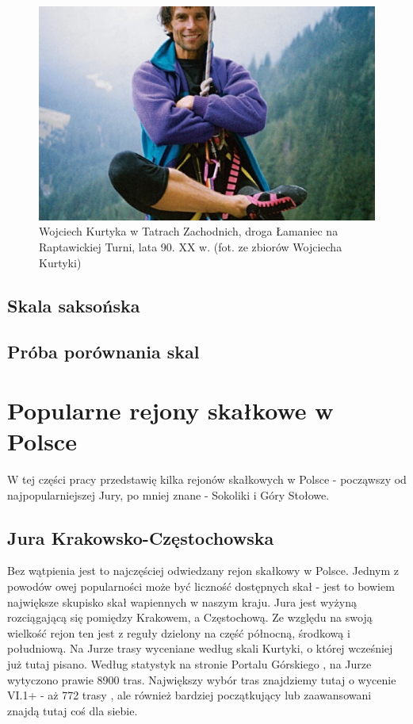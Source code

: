 \documentclass{article}
\begin{document}
\begin{figure}[!htbp]
	\begin{center}
		\includegraphics[width=0.9\linewidth]{images/kurtyka.eps}
	\end{center}
	\caption{Wojciech Kurtyka w Tatrach Zachodnich, droga Łamaniec na Raptawickiej Turni, lata 90. XX w. (fot. ze zbiorów Wojciecha Kurtyki) \cite{tyg-powszechni-kurtyka}}
	\label{kurtyka}
\end{figure}

\subsection{Skala saksońska}

\subsection{Próba porównania skal}
\label{porownanie}

\section{Popularne rejony skałkowe w Polsce}
\lettrine[lines=2]{W}{} tej części pracy przedstawię kilka rejonów skałkowych w Polsce - począwszy od najpopularniejszej Jury, po mniej znane - Sokoliki i Góry Stołowe.

\subsection{Jura Krakowsko-Częstochowska}
Bez wątpienia jest to najczęściej odwiedzany rejon skałkowy w Polsce. Jednym z powodów owej popularności może być liczność dostępnych skał - jest to bowiem największe skupisko skał wapiennych w naszym kraju. Jura jest wyżyną rozciągającą się pomiędzy Krakowem, a Częstochową. Ze względu na swoją wielkość rejon ten jest z reguły dzielony na część północną, środkową i południową. Na Jurze trasy wyceniane według skali Kurtyki, o której wcześniej już tutaj pisano. Według statystyk na stronie Portalu Górskiego \cite{topo-jura}, na Jurze wytyczono prawie 8900 tras. Największy wybór tras znajdziemy tutaj o wycenie VI.1+ - aż 772 trasy \cite{topo-jura}, ale również bardziej początkujący lub zaawansowani znajdą tutaj coś dla siebie.
\end{document}
